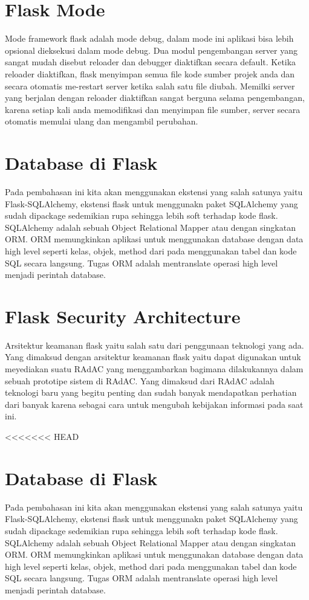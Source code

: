 \begin{itemize}
\begin{itemize}
\section{Flask Mode}
Mode framework flask adalah mode debug, dalam mode ini aplikasi bisa lebih opsional dieksekusi dalam mode debug. Dua modul pengembangan server yang sangat mudah disebut reloader dan debugger diaktifkan secara default.
Ketika reloader diaktifkan, flask menyimpan semua file kode sumber projek anda dan secara otomatis me-restart server ketika salah satu file diubah. 
Memilki server yang berjalan dengan reloader diaktifkan sangat berguna selama pengembangan, karena setiap kali anda memodifikasi dan menyimpan file sumber, server secara otomatis memulai ulang dan mengambil perubahan.

\section{Database di Flask}
Pada pembahasan ini kita akan menggunakan ekstensi yang salah satunya yaitu Flask-SQLAlchemy, ekstensi flask untuk menggunakn paket SQLAlchemy yang sudah dipackage sedemikian rupa sehingga lebih soft terhadap kode flask.
SQLAlchemy adalah sebuah Object Relational Mapper atau dengan singkatan ORM. ORM memungkinkan aplikasi untuk menggunakan database dengan data high level seperti kelas, objek, method dari pada menggunakan tabel dan kode SQL secara langsung. 
Tugas ORM adalah mentranslate operasi high level menjadi perintah database.

\section{Flask Security Architecture}
Arsitektur keamanan flask yaitu salah satu dari penggunaan teknologi yang ada. Yang dimaksud dengan arsitektur keamanan flask yaitu dapat digunakan untuk meyediakan suatu RAdAC yang menggambarkan bagimana dilakukannya dalam sebuah prototipe sistem di RAdAC. Yang dimaksud dari RAdAC adalah teknologi baru yang begitu penting dan sudah banyak mendapatkan perhatian dari banyak karena sebagai cara untuk mengubah kebijakan informasi pada saat ini.

<<<<<<< HEAD
\section{Database di Flask}
Pada pembahasan ini kita akan menggunakan ekstensi yang salah satunya yaitu Flask-SQLAlchemy, ekstensi flask untuk menggunakn paket SQLAlchemy yang sudah dipackage sedemikian rupa sehingga lebih soft terhadap kode flask. 
SQLAlchemy adalah sebuah Object Relational Mapper atau dengan singkatan ORM. ORM memungkinkan aplikasi untuk menggunakan database dengan data high level seperti kelas, objek, method dari pada menggunakan tabel dan kode SQL secara langsung. 
Tugas ORM adalah mentranslate operasi high level menjadi perintah database.




\end{itemize}
\end{itemize}
